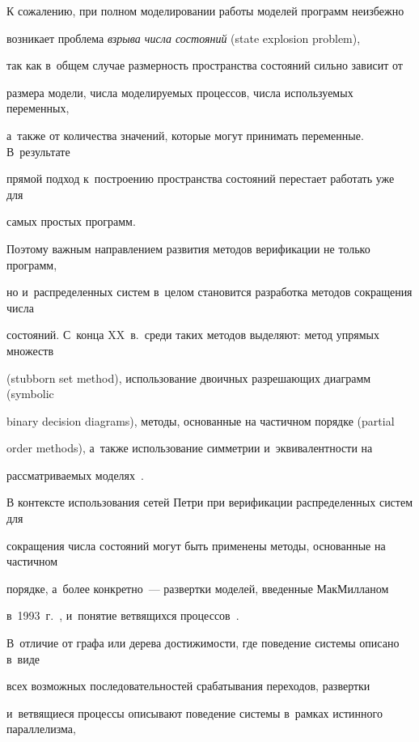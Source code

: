 К сожалению, при полном моделировании работы моделей программ неизбежно 


возникает проб\-ле\-ма \textit{взрыва чис\-ла со\-сто\-яний} (state explosion problem), 


так как в~об\-щем случае раз\-мер\-ность пространства со\-сто\-яний сильно зависит от 


размера модели, чис\-ла мо\-де\-ли\-ру\-емых процессов, чис\-ла ис\-поль\-зу\-емых переменных, 


а~так\-же от количества значений, которые могут принимать переменные. В~результате 


прямой подход к~по\-стро\-ению пространства со\-сто\-яний перестает работать уже для 


самых прос\-тых программ.


Поэтому  важ\-ным на\-прав\-ле\-ни\-ем развития методов верификации не только программ, 


но и~распределенных сис\-тем в~целом становится разработка методов сокращения чис\-ла 


со\-сто\-яний.  С~конца XX~в.\ среди таких методов выделяют: метод упря\-мых множеств 


(stubborn set method), использование двоичных разрешающих диаграмм (symbolic 


binary decision diagrams), методы, основанные на час\-тич\-ном порядке (partial 


order methods), а~так\-же использование сим\-мет\-рии и~эк\-ви\-ва\-лент\-ности на 


рас\-смат\-ри\-ва\-емых моделях~\cite{Valmari:1998}.





В контексте использования сетей Петри при верификации распределенных систем для 


со\-кра\-ще\-ния чис\-ла со\-сто\-яний могут быть применены методы, основанные на частичном 


порядке, а~более кон\-крет\-но~--- развертки моделей, введенные МакМилланом 


в~1993~г.~\cite{McMillan:93}, и~понятие вет\-вя\-щих\-ся процессов~\cite{Engelfriet:91}. 


В~отличие от графа или дерева до\-сти\-жи\-мости, где поведение сис\-те\-мы описано в~виде 


всех воз\-мож\-ных последовательностей срабатывания переходов, раз\-верт\-ки 


и~вет\-вя\-щи\-еся процессы описывают поведение сис\-те\-мы в~рамках истинного параллелизма, 


